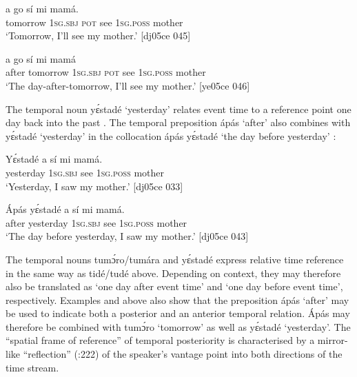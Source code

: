 \ea%
    \label{ex:key:1010}
    \gll {}    a    go  sí  mi    mamá.\\
tomorrow  \textsc{1sg.sbj}  \textsc{pot}  see  \textsc{1sg.poss}  mother\\

\glt ‘Tomorrow, I’ll see my mother.’ [dj05ce 045] 
\z


\ea%
    \label{ex:key:1011}
    \gll {}      a    go  sí  mi    mamá\\
after  tomorrow  \textsc{1sg.sbj}  \textsc{pot}  see  \textsc{1sg.poss}  mother\\

\glt ‘The day-after-tomorrow, I’ll see my mother.’ [ye05ce 046]
\z

The temporal noun yɛ́stadé ‘yesterday’ relates event time to a reference point one day back into the past . The temporal preposition ápás ‘after’ also combines with yɛ́stadé ‘yesterday’ in the collocation ápás yɛ́stadé ‘the day before yesterday’ : 


\ea%
    \label{ex:key:1012}
    \gll Yɛ́stadé    a    sí  mi    mamá.\\
yesterday  \textsc{1sg.sbj}  see  \textsc{1sg.poss}  mother\\

\glt ‘Yesterday, I saw my mother.’ [dj05ce 033]
\z


\ea%
    \label{ex:key:1013}
    \gll \'{A}pás  yɛ́stadé    a    sí  mi    mamá.\\
after  yesterday  \textsc{1sg.sbj}  see  \textsc{1sg.poss}  mother\\

\glt ‘The day before yesterday, I saw my mother.’ [dj05ce 043]
\z

The temporal nouns tumɔ́ro/tumára and yɛ́stadé express relative time reference in the same way as tidé/tudé above. Depending on context, they may therefore also be translated as ‘one day after event time’ and ‘one day before event time’, respectively. Examples  and  above also show that the preposition ápás ‘after’ may be used to indicate both a posterior and an anterior temporal relation. \'{A}pás may therefore be combined with tumɔ́ro ‘tomorrow’ as well as yɛ́stadé ‘yesterday’. The “spatial frame of reference” \citep[24]{Levinson2003} of temporal posteriority is characterised by a mirror-like “reflection” (\citealt{BenderBannardo2005}:222) of the speaker’s vantage point into both directions of the time stream.{\fff}


